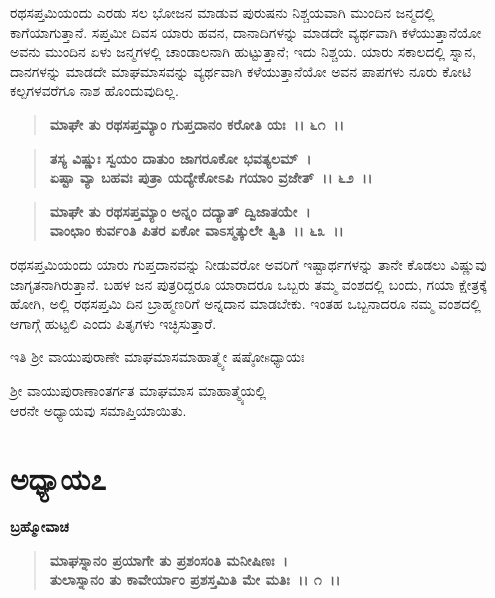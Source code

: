 ರಥಸಪ್ತಮಿಯಂದು ಎರಡು ಸಲ ಭೋಜನ ಮಾಡುವ ಪುರುಷನು ನಿಶ್ಚಯವಾಗಿ ಮುಂದಿನ ಜನ್ಮದಲ್ಲಿ ಕಾಗೆಯಾಗುತ್ತಾನೆ. ಸಪ್ತಮೀ ದಿವಸ ಯಾರು ಹವನ, ದಾನಾದಿಗಳನ್ನು ಮಾಡದೇ ವ್ಯರ್ಥವಾಗಿ ಕಳೆಯುತ್ತಾನೆಯೋ ಅವನು ಮುಂದಿನ ಏಳು ಜನ್ಮಗಳಲ್ಲಿ ಚಾಂಡಾಲನಾಗಿ ಹುಟ್ಟುತ್ತಾನೆ; ಇದು ನಿಶ್ಚಯ. ಯಾರು ಸಕಾಲದಲ್ಲಿ ಸ್ನಾನ, ದಾನಗಳನ್ನು ಮಾಡದೇ ಮಾಘಮಾಸವನ್ನು ವ್ಯರ್ಥವಾಗಿ ಕಳೆಯುತ್ತಾನೆಯೋ ಅವನ ಪಾಪಗಳು ನೂರು ಕೋಟಿ ಕಲ್ಪಗಳವರೆಗೂ ನಾಶ ಹೊಂದುವುದಿಲ್ಲ.

\begin{verse}
\textbf{ಮಾಘೇ ತು ರಥಸಪ್ತಮ್ಯಾಂ ಗುಪ್ತದಾನಂ ಕರೋತಿ ಯಃ~।। ೬೧~।।} 
\end{verse}

\begin{verse}
\textbf{ತಸ್ಯ ವಿಷ್ಣುಃ ಸ್ವಯಂ ದಾತುಂ ಜಾಗರೂಕೋ ಭವತ್ಯಲಮ್~।}\\\textbf{ಏಷ್ಟಾ ವ್ಯಾ ಬಹವಃ ಪುತ್ರಾ ಯದ್ಯೇಕೋಽಪಿ ಗಯಾಂ ವ್ರಜೇತ್~।। ೬೨~।। }
\end{verse}

\begin{verse}
\textbf{ಮಾಘೇ ತು ರಥಸಪ್ತಮ್ಯಾಂ ಅನ್ನಂ ದದ್ಯಾತ್ ದ್ವಿಜಾತಯೇ~।}\\\textbf{ವಾಂಛಾಂ ಕುರ್ವಂತಿ ಪಿತರ ಏಕೋ ವಾಽಸ್ಮತ್ಕುಲೇ ತ್ವಿತಿ~।। ೬೩~।।}
\end{verse}

ರಥಸಪ್ತಮಿಯಂದು ಯಾರು ಗುಪ್ತದಾನವನ್ನು ನೀಡುವರೋ ಅವರಿಗೆ ಇಷ್ಟಾರ್ಥಗಳನ್ನು ತಾನೇ ಕೊಡಲು ವಿಷ್ಣುವು ಜಾಗೃತನಾಗಿರುತ್ತಾನೆ. ಬಹಳ ಜನ ಪುತ್ರರಿದ್ದರೂ ಯಾರಾದರೂ ಒಬ್ಬರು ತಮ್ಮ ವಂಶದಲ್ಲಿ ಬಂದು, ಗಯಾ ಕ್ಷೇತ್ರಕ್ಕೆ ಹೋಗಿ, ಅಲ್ಲಿ ರಥಸಪ್ತಮಿ ದಿನ ಬ್ರಾಹ್ಮಣರಿಗೆ ಅನ್ನದಾನ ಮಾಡಬೇಕು. ಇಂತಹ ಒಬ್ಬನಾದರೂ ನಮ್ಮ ವಂಶದಲ್ಲಿ ಆಗಾಗ್ಗೆ ಹುಟ್ಟಲಿ ಎಂದು ಪಿತೃಗಳು ಇಚ್ಛಿಸುತ್ತಾರೆ.

\begin{center}
ಇತಿ ಶ‍್ರೀ ವಾಯುಪುರಾಣೇ ಮಾಘಮಾಸಮಾಹಾತ್ಮ್ಯೇ ಷಷ್ಠೋsಧ್ಯಾಯಃ 
\end{center}

\begin{center}
ಶ‍್ರೀ ವಾಯುಪುರಾಣಾಂತರ್ಗತ ಮಾಘಮಾಸ ಮಾಹಾತ್ಮ್ಯೆಯಲ್ಲಿ \\ ಆರನೇ ಅಧ್ಯಾಯವು ಸಮಾಪ್ತಿಯಾಯಿತು.
\end{center}

\newpage

\section*{ಅಧ್ಯಾಯ\enginline{-}೭}

\emptypage

\begin{flushleft}
\textbf{ಬ್ರಹ್ಮೋವಾಚ\enginline{-} }
\end{flushleft}

\begin{verse}
\textbf{ಮಾಘಸ್ನಾನಂ ಪ್ರಯಾಗೇ ತು ಪ್ರಶಂಸಂತಿ ಮನೀಷಿಣಃ~।}\\\textbf{ತುಲಾಸ್ನಾನಂ ತು ಕಾವೇರ್ಯಾಂ ಪ್ರಶಸ್ತಮಿತಿ ಮೇ ಮತಿಃ~।। ೧~।। }
\end{verse}

